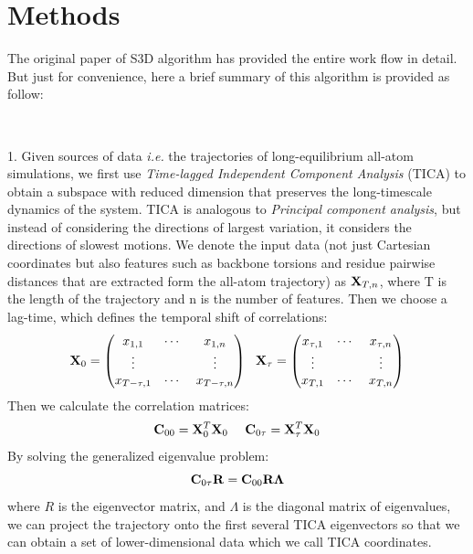 \documentclass[12pt]{article}
\begin{document}
\section*{Methods}

The original paper of S3D algorithm has provided the entire work flow in detail\cite{Lrenzo_S3D}. But just for convenience, here a brief summary of this algorithm is provided as follow:

\ \ 

\hangindent=0.7cm
1. Given sources of data {\it i.e.} the trajectories of long-equilibrium all-atom simulations, we first use {\it Time-lagged Independent Component Analysis} (TICA) to obtain a subspace with reduced dimension that preserves the long-timescale dynamics of the system\cite{TICA}. TICA is analogous to {\it Principal component analysis}, but instead of considering the directions of largest variation, it considers the directions of slowest motions. We denote the input data (not just Cartesian coordinates but also features such as backbone torsions and residue pairwise distances that are extracted form the all-atom trajectory) as ${\bf X}_{T, n}$, where T is the length of the trajectory and n is the number of features. Then we choose a lag-time, which defines the temporal shift of correlations:
\begin{equation}
{\bf X}_{0} = \begin{pmatrix}
x_{1,1} & \cdots\ & x_{1,n} \\
\vdots & & \vdots \\
x_{T-\tau,1} & \cdots\ & x_{T-\tau,n}\\
\end{pmatrix} \ \ 
{\bf X}_{\tau} = \begin{pmatrix}
x_{\tau,1} & \cdots\ & x_{\tau,n} \\
\vdots & & \vdots \\
x_{T,1} & \cdots\ & x_{T,n}\\
\end{pmatrix}
\end{equation}
Then we calculate the correlation matrices:
\begin{equation}
{\bf C}_{00} = {\bf X}_{0}^{T}{\bf X}_{0} \ \ \ \ 
{\bf C}_{0\tau} = {\bf X}_{\tau}^{T}{\bf X}_{0}
\end{equation}
By solving the generalized eigenvalue problem:
\begin{equation}
{\bf C}_{0\tau}{\bf R} = {\bf C}_{00}{\bf R}{\bf \Lambda}
\end{equation}
where $R$ is the eigenvector matrix, and $\Lambda$ is the diagonal matrix of eigenvalues, we can project the trajectory onto the first several TICA eigenvectors so that we can obtain a set of lower-dimensional data which we call TICA coordinates\cite{variational_approach,variational_principle}.
\end{document}
